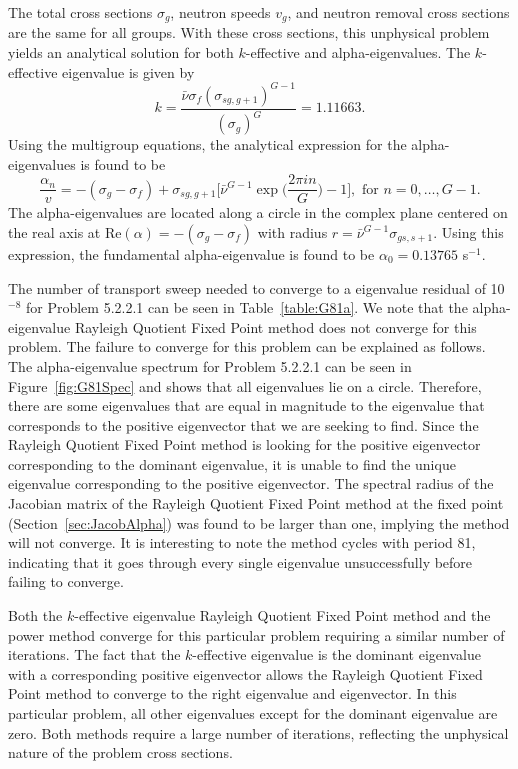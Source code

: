 The total cross sections $\sigma_{g}$, neutron speeds $v_{g}$, and neutron removal cross sections are the same for all groups. With these cross sections, this unphysical problem yields an analytical solution for both $k$-effective and alpha-eigenvalues. The $k$-effective eigenvalue is given by
\begin{equation}
	k = \frac{\bar{\nu} \sigma_{f} (\sigma_{sg,g+1})^{G-1}}{(\sigma_{g})^{G}} = 1.11663.
\end{equation}
Using the multigroup equations, the analytical expression for the alpha-eigenvalues is found to be
\begin{equation}
\frac{\alpha_{n}}{v} = -(\sigma_{g} - \sigma_{f}) + \sigma_{sg,g+1} \bigg [ \bar{\nu}^{G-1} \exp \bigg ( \frac{2 \pi i n}{G} \bigg ) - 1 \bigg ], \text{ for } n = 0, \dots, G-1. 
\end{equation}
The alpha-eigenvalues are located along a circle in the complex plane centered on the real axis at $\text{Re}(\alpha) = -(\sigma_{g} - \sigma_{f})$ with radius $r = \bar{\nu}^{G-1} \sigma_{gs,s+1}$. Using this expression, the fundamental alpha-eigenvalue is found to be $\alpha_{0} = 0.13765$ s$^{-1}$. 

The number of transport sweep needed to converge to a eigenvalue residual of 10$^{-8}$ for Problem 5.2.2.1 can be seen in Table~\ref{table:G81a}. We note that the alpha-eigenvalue Rayleigh Quotient Fixed Point method does not converge for this problem. The failure to converge for this problem can be explained as follows. The alpha-eigenvalue spectrum for Problem 5.2.2.1 can be seen in Figure~\ref{fig:G81Spec} and shows that all eigenvalues lie on a circle. Therefore, there are some eigenvalues that are equal in magnitude to the eigenvalue that corresponds to the positive eigenvector that we are seeking to find. Since the Rayleigh Quotient Fixed Point method is looking for the positive eigenvector corresponding to the dominant eigenvalue, it is unable to find the unique eigenvalue corresponding to the positive eigenvector. The spectral radius of the Jacobian matrix of the Rayleigh Quotient Fixed Point method at the fixed point (Section~\ref{sec:JacobAlpha}) was found to be larger than one, implying the method will not converge. It is interesting to note the method cycles with period 81, indicating that it goes through every single eigenvalue unsuccessfully before failing to converge.

Both the $k$-effective eigenvalue Rayleigh Quotient Fixed Point method and the power method converge for this particular problem requiring a similar number of iterations. The fact that the $k$-effective eigenvalue is the dominant eigenvalue with a corresponding positive eigenvector allows the Rayleigh Quotient Fixed Point method to converge to the right eigenvalue and eigenvector. In this particular problem, all other eigenvalues except for the dominant eigenvalue are zero. Both methods require a large number of iterations, reflecting the unphysical nature of the problem cross sections. 

